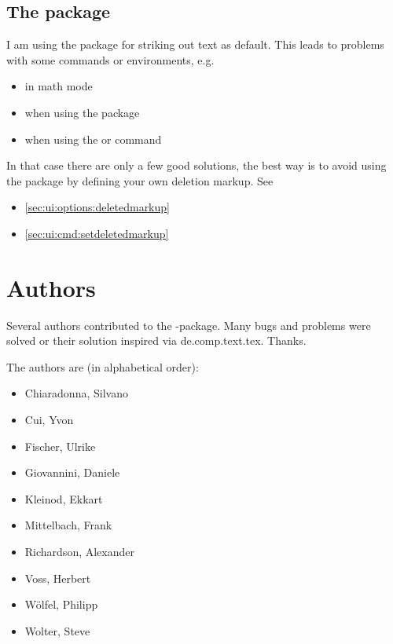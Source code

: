 \subsection{The  package}

I am using the  package for striking out text as default.
This leads to problems with some commands or environments, e.g.

\begin{itemize}
	\item in math mode
	\item when using the  package
	\item when using the  or  command
\end{itemize}

In that case there are only a few good solutions, the best way is to avoid using the  package by defining your own deletion markup.
See

\begin{itemize}
	\item \autoref{sec:ui:options:deletedmarkup}
	\item \autoref{sec:ui:cmd:setdeletedmarkup}
\end{itemize}


\cleardoublepage
\section{Authors}
\label{sec:authors}

Several authors contributed to the -package.
Many bugs and problems were solved or their solution inspired via de.comp.text.tex.
Thanks.

The authors are (in alphabetical order):
\begin{itemize}
	\item Chiaradonna, Silvano
	\item Cui, Yvon
	\item Fischer, Ulrike
	\item Giovannini, Daniele
	\item Kleinod, Ekkart
	\item Mittelbach, Frank
	\item Richardson, Alexander
	\item Voss, Herbert
	\item Wölfel, Philipp
	\item Wolter, Steve
\end{itemize}



